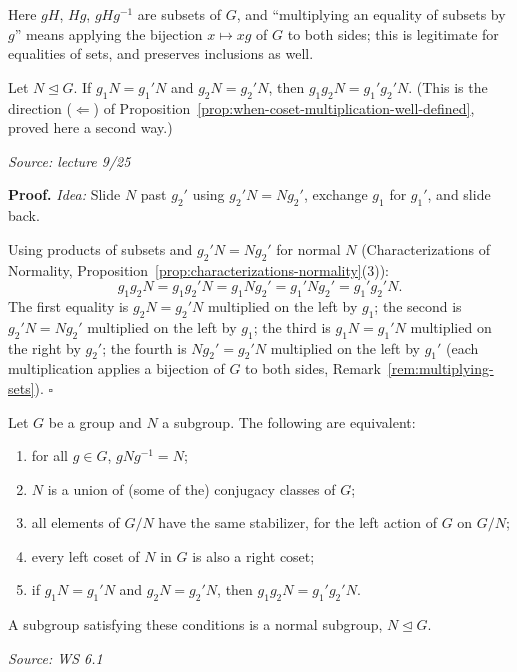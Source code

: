 \documentclass[11pt]{report}
\renewenvironment{proof}[1][Proof]{\noindent\textbf{#1.} }{\hfill$\square$\par\vspace{5pt}}
\newcommand{\srcline}[1]{\par\hfill{\footnotesize\textit{Source: #1}}}
\begin{document}
\begin{rembox}\label{rem:multiplying-sets}
Here $gH$, $Hg$, $gHg^{-1}$ are subsets of $G$, and ``multiplying an equality of subsets by $g$'' means applying the bijection $x \mapsto xg$ of $G$ to both sides; this is legitimate for equalities of sets, and preserves inclusions as well.
\end{rembox}

\begin{propbox}\label{prop:normal-coset-multiplication-set-products}
Let $N \trianglelefteq G$. If $g_1N = g_1'N$ and $g_2N = g_2'N$, then $g_1g_2N = g_1'g_2'N$. (This is the direction ($\Leftarrow$) of Proposition~\ref{prop:when-coset-multiplication-well-defined}, proved here a second way.)
\srcline{lecture 9/25}
\end{propbox}

\begin{proof}
\textit{Idea:} Slide $N$ past $g_2'$ using $g_2'N = Ng_2'$, exchange $g_1$ for $g_1'$, and slide back.\par
Using products of subsets and $g_2'N = Ng_2'$ for normal $N$ (Characterizations of Normality, Proposition~\ref{prop:characterizations-normality}(3)):
\[ g_1g_2N = g_1g_2'N = g_1Ng_2' = g_1'Ng_2' = g_1'g_2'N. \]
The first equality is $g_2N = g_2'N$ multiplied on the left by $g_1$; the second is $g_2'N = Ng_2'$ multiplied on the left by $g_1$; the third is $g_1N = g_1'N$ multiplied on the right by $g_2'$; the fourth is $Ng_2' = g_2'N$ multiplied on the left by $g_1'$ (each multiplication applies a bijection of $G$ to both sides, Remark~\ref{rem:multiplying-sets}).
\end{proof}

\begin{thmbox}\label{thm:five-characterizations-normality}
Let $G$ be a group and $N$ a subgroup. The following are equivalent:
\begin{enumerate}
    \item for all $g \in G$, $gNg^{-1} = N$;
    \item $N$ is a union of (some of the) conjugacy classes of $G$;
    \item all elements of $G/N$ have the same stabilizer, for the left action of $G$ on $G/N$;
    \item every left coset of $N$ in $G$ is also a right coset;
    \item if $g_1N = g_1'N$ and $g_2N = g_2'N$, then $g_1g_2N = g_1'g_2'N$.
\end{enumerate}
A subgroup satisfying these conditions is a normal subgroup, $N \trianglelefteq G$.
\srcline{WS 6.1}
\end{thmbox}
\end{document}
